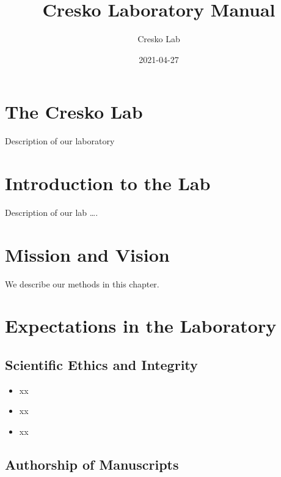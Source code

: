 \documentclass[
]{book}
\title{Cresko Laboratory Manual}
\author{Cresko Lab}
\date{2021-04-27}
\providecommand{\tightlist}{%
  \setlength{\itemsep}{0pt}\setlength{\parskip}{0pt}}
\begin{document}
\maketitle

{
\setcounter{tocdepth}{1}
\tableofcontents
}
\hypertarget{the-cresko-lab}{%
\chapter{The Cresko Lab}\label{the-cresko-lab}}

Description of our laboratory

\hypertarget{introduction-to-the-lab}{%
\chapter{Introduction to the Lab}\label{introduction-to-the-lab}}

Description of our lab \ldots.

\hypertarget{mission-and-vision}{%
\chapter{Mission and Vision}\label{mission-and-vision}}

We describe our methods in this chapter.

\hypertarget{expectations-in-the-laboratory}{%
\chapter{Expectations in the Laboratory}\label{expectations-in-the-laboratory}}

\hypertarget{scientific-ethics-and-integrity}{%
\section{Scientific Ethics and Integrity}\label{scientific-ethics-and-integrity}}

\begin{itemize}
\tightlist
\item
  xx
\item
  xx
\item
  xx
\end{itemize}

\hypertarget{authorship-of-manuscripts}{%
\section{Authorship of Manuscripts}\label{authorship-of-manuscripts}}
\end{document}

